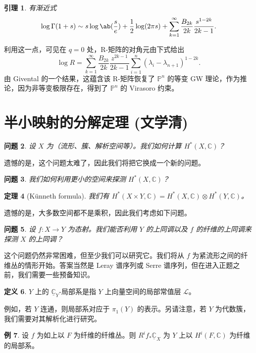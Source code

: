 \documentclass{amsart}
\newtheorem{thm}{定理}[section]
\newtheorem{lem}[thm]{引理}
\newtheorem{quest}[thm]{问题}
\theoremstyle{definition}
\newtheorem{defn}[thm]{定义}
\newtheorem{exm}[thm]{例}
\theoremstyle{remark}
\theoremstyle{plain}
\theoremstyle{definition}
\theoremstyle{remark}
\newcommand{\C}{\mathbb{C}}
\renewcommand{\P}{\mathbb{P}}
\newcommand{\mc}[1]{\mathcal{#1}}
\newcommand{\ul}[1]{\underline{#1}}
\newcommand{\1}{\mathbf{1}}
\newcommand{\2}{\mathbf{2}}
\newcommand{\3}{\mathbf{3}}
\begin{document}
\begin{lem}
    有渐近式
    \[ \log \Gamma(1+s) \sim s \log \ab(\frac{s}{e}) + \frac{1}{2} \log(2\pi s) + \sum_{k=1}^{\infty} \frac{B_{2k}}{2k} \frac{s^{1-2k}}{2k-1}. \]
\end{lem}
利用这一点，可见在 \(q = 0\) 处，R-矩阵的对角元由下式给出
\[ \log R = \sum_{k=1}^{\infty} \frac{B_{2k}}{2k} \frac{z^{2k-1}}{2k-1} \sum_{i =1}^n (\lambda_i - \lambda_{n+1})^{1-2k}. \]
由 Givental 的一个结果，这蕴含该 R-矩阵恢复了 \(\P^n\) 的等变 GW 理论，作为推论，因为非等变极限存在，得到了 \(\P^n\) 的 Virasoro 约束。
\section{半小映射的分解定理 (文学清)}%
\label{sec:Decomposition theorem for semi-small maps (Xueqing Wen)}

\begin{quest}
    设 \(X\) 为（流形、簇、解析空间等）。我们如何计算 \(H^*(X, \C)\)？
\end{quest}

遗憾的是，这个问题太难了，因此我们将把它换成一个新的问题。

\begin{quest}
    我们如何利用更小的空间来探测 \(H^*(X, \C)\)？
\end{quest}

\begin{thm}[K\"unneth formula]
    我们有 \(H^*(X \times Y, \C) = H^*(X, \C) \otimes H^*(Y, \C)\)。
\end{thm}

遗憾的是，大多数空间都不是乘积，因此我们考虑如下问题。

\begin{quest}
    设 \(f \colon X \to Y\) 为态射。我们能否利用 \(Y\) 的上同调以及 \(f\) 的纤维的上同调来探测 \(X\) 的上同调？
\end{quest}

这个问题仍然非常困难，但至少我们可以研究它。我们将从 \(f\) 为紧流形之间的纤维丛的情形开始。答案当然是 Leray 谱序列或 Serre 谱序列，但在进入正题之前，我们需要一些预备知识。

\begin{defn}
    \(Y\) 上的 \(\ul{\C}_Y\)-局部系是指 \(Y\) 上向量空间的局部常值层 \(\mc{L}\)。
\end{defn}

例如，若 \(Y\) 连通，则局部系对应于 \(\pi_1(Y)\) 的表示。另请注意，若 \(Y\) 为代数簇，我们需要对其解析化进行研究。

\begin{exm}
    设 \(f\) 为如上以 \(F\) 为纤维的纤维丛。则 \(R^i f_* \ul{\C}_X\) 为 \(Y\) 上以 \(H^i(F, \C)\) 为纤维的局部系。
\end{exm}
\end{document}
